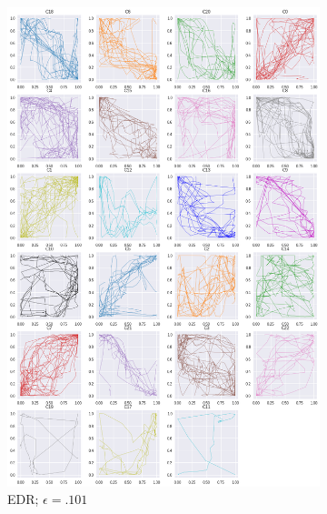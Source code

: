 \begin{figure}[h]
  \begin{subfigure}[c]{0.35\linewidth}
     \includegraphics[width=\linewidth]{figs/clusters/CLU_H_ALL[EDR;e=.101].png}
    \caption{EDR; $\epsilon=.101$}
  \end{subfigure}
  \hspace{.5em}
    \begin{subfigure}[c]{0.35\linewidth}

\end{subfigure}
\end{figure}
